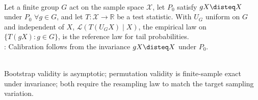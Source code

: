 \begin{definition} \label{def:permutation-test} \\
Let a finite group $G$ act on the sample space $\mathcal{X}$, let $P_0$ satisfy $gX\disteq X$ under $P_0$ $\forall g\in G$, and let $T:\mathcal{X}\to\mathbb{R}$ be a test statistic. With $U_G$ uniform on $G$ and independent of $X$, $\mathcal{L}(T(U_GX)\mid X)$, the empirical law on $\{T(gX):g\in G\}$, is the reference law for tail probabilities.\\
: Calibration follows from the invariance $gX\disteq X$ under $P_0$.
\end{definition}

\begin{remark} \label{rem:resampling-validity} \\
Bootstrap validity is asymptotic; permutation validity is finite-sample exact under invariance; both require the resampling law to match the target sampling variation.
\end{remark}
